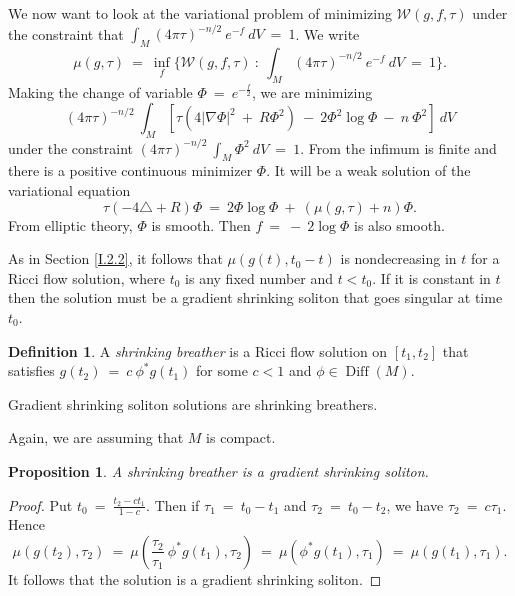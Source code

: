 \documentclass[12pt]{amsart}
\newcommand{\Diff}{\operatorname{Diff}}
\numberwithin{equation}{section}
\theoremstyle{plain}
\newtheorem{proposition}[equation]{Proposition}
\theoremstyle{definition}
\newtheorem{definition}[equation]{Definition}
\theoremstyle{remark}
\begin{document}
We now want to look at the variational problem of 
minimizing ${\mathcal W}(g,f,\tau)$ under the constraint
that $\int_M (4 \pi \tau)^{-n/2} \: e^{-f} \: dV \: = \: 1$.
We write
\begin{equation}
\mu(g, \tau) \: = \: \inf_f \{ {\mathcal W}(g,f,\tau) \: : \: 
\int_M (4 \pi \tau)^{-n/2} \: e^{-f} \: dV \: = \: 1\}.
\end{equation}
Making the change of variable $\Phi \: = \: e^{- \frac{f}{2}}$, we are
minimizing
\begin{equation}
(4 \pi \tau)^{-n/2} \: \int_M \left[ \tau (4 |\nabla \Phi|^2 \: + \: R \Phi^2) \: - \:
2 \Phi^2 \log \Phi \: - \: n \: \Phi^2 \right] \: dV
\end{equation}
under the constraint $(4 \pi \tau)^{-n/2} \: \int_M \Phi^2 \: dV \: = \: 1$.
From  \cite[Section 1]{Rothaus (1981)} the infimum is finite and
there is a positive
continuous minimizer $\Phi$. It will be a weak solution of the
variational equation
\begin{equation}
\tau (- 4 \triangle + R) \Phi \: = \: 2\Phi \log \Phi \: + \: 
(\mu(g, \tau) + n) \Phi.
\end{equation}
From elliptic theory, $\Phi$ is smooth. Then $f \: = \: - \: 2 \log \Phi$
is also smooth.

As in Section \ref{I.2.2}, it follows that
$\mu(g(t), t_0 - t)$ is nondecreasing in $t$ for a Ricci flow
solution, where $t_0$ is any fixed number and $t < t_0$. 
If it is constant in $t$ then the solution must be
a gradient shrinking soliton that goes singular at time $t_0$.

\begin{definition}
A {\em shrinking breather} is a Ricci flow solution on $[t_1, t_2]$ that
satisfies $g(t_2) \: = \: c \: \phi^* g(t_1)$ for some
$c < 1$ and $\phi \in \Diff(M)$. 
\end{definition}

Gradient shrinking soliton solutions
are shrinking breathers.

Again, we are assuming that $M$ is
compact.

\begin{proposition}
A shrinking breather is a gradient shrinking soliton.
\end{proposition}
\begin{proof}
Put $t_0 \: = \: \frac{t_2 - c t_1}{1-c}$. Then if
$\tau_1 \: = \: t_0 - t_1$ and $\tau_2 \: = \: t_0 - t_2$, we
have $\tau_2 \: = \: c\tau_1$. Hence
\begin{equation}
\mu(g(t_2), \tau_2) \: = \: \mu \left( \frac{\tau_2}{\tau_1} \:
\phi^* g(t_1), \tau_2 \right) \: = \: 
\mu \left(\phi^* g(t_1), \tau_1 \right)
 \: = \: 
\mu \left(g(t_1), \tau_1 \right).
\end{equation}
It follows that the solution is a gradient shrinking soliton.
\end{proof}
\end{document}
